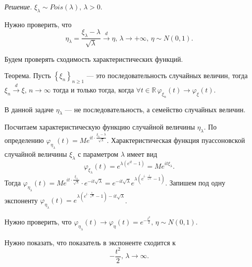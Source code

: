 \textit{Решение.} $ \xi_{ \lambda } \sim Pois \left( \lambda \right), \, \lambda > 0$.

Нужно проверить, что
$$ \eta_{ \lambda } =
\frac{ \xi_{ \lambda } - \lambda }{ \sqrt{ \lambda }} \overset{d}{ \rightarrow } \eta, \,
\lambda \rightarrow + \infty, \,
\eta \sim N \left( 0, 1 \right).$$

Будем проверять сходимость характеристических функций.

Теорема.
Пусть $ \left\{ \xi_n \right\}_{n \geq 1}$ --- это последовательность случайных величин,
тогда $ \xi_n \overset{d}{ \rightarrow } \xi, \, n \rightarrow \infty $ тогда и только тогда,
когда
$ \forall t \in \mathbb{R} \,
\varphi_{ \xi_n} \left( t \right) \rightarrow \varphi_{ \xi } \left( t \right) $.

В данной задаче $ \eta_{ \lambda }$ --- не последовательность, а семейство случайных величин.

Посчитаем характеристическую функцию случайной величины $ \eta_{ \lambda }$.
По определению
$ \varphi_{ \eta_{ \lambda }} \left( t \right) =
Me^{it \cdot \frac{ \xi_{ \lambda } - \lambda }{ \sqrt{ \lambda }}}$.
Характеристическая функция пуассоновской случайной величины $ \xi_{ \lambda }$ с параметром
$ \lambda $ имеет вид
$$ \varphi_{ \xi_{ \lambda }} \left( t \right) =
e^{ \lambda \left( e^{it} - 1 \right) } =
Me^{it \xi_{ \lambda }}.$$
Тогда
$ \varphi_{ \eta_{ \lambda }} \left( t \right) =
Me^{it \cdot \frac{ \xi_{ \lambda }}{ \sqrt{ \lambda }}} \cdot e^{-it \sqrt{ \lambda }} =
e^{-it \sqrt{ \lambda }} e^{ \lambda \left( e^{i \cdot \frac{t}{ \sqrt{ \lambda }}} - 1 \right) }$.
Запишем под одну экспоненту
$ \varphi_{ \eta_{ \lambda }} \left( t \right) =
e^{ \lambda  \left( e^{i \cdot \frac{t}{ \sqrt{ \lambda }}} - 1 \right) - it \sqrt{ \lambda }}$.

Нужно проверить,
что
$ \varphi_{ \eta_{ \lambda }} \left( t \right) \rightarrow \varphi_{ \eta } \left( t \right) =
e^{- \frac{t^2}{2}}, \, \eta \sim N \left( 0, 1 \right) $.

Нужно показать, что показатель в экспоненте сходится к
$$ - \frac{t^2}{2}, \, \lambda \rightarrow \infty .$$

